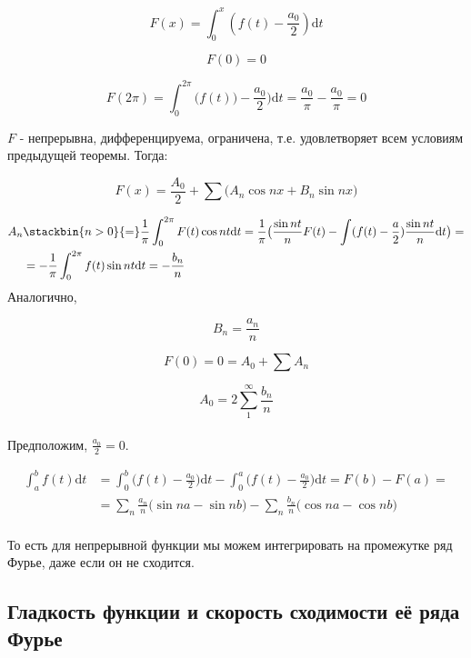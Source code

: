 \documentclass[12pt]{article}
\newcommand{\dd}{\ensuremath{\mathrm{d}}}
\begin{document}
  $$F(x) = \int_{0}^{x} (f(t) - \frac{a_0}{2}) \dd t$$
  
  $$F(0) = 0$$
  
  $$F(2\pi) = \int_{0}^{2\pi} \big( f(t)) - \frac{a_0}{2} \big) \dd t = \frac{a_0}{\pi} - \frac{a_0}{\pi} = 0$$
  
  $F$ - непрерывна, дифференцируема, ограничена, т.е. удовлетворяет всем условиям предыдущей теоремы.
  Тогда:
  
  $$F(x) = \frac{A_0}{2}+ \sum \big( A_n\cos{nx} + B_n\sin{nx} \big)$$
  
  \begin{align*}
      A_n & \stackbin{n > 0}{=} \frac{1}{\pi} \int_{0}^{2\pi} F(t)\cos{nt}\dd t = \frac{1}{\pi} \big( \frac{\sin{nt}}{n} F(t) - \int (f(t) - \frac{a}{2}) \frac{\sin{nt}}{n} \dd t \big) = \\
  &= -\frac{1}{\pi} \int_{0}^{2\pi} f(t)\sin{nt}\dd t = -\frac{b_n}{n} \\ 
  \end{align*}
  Аналогично,
  
  $$ B_n = \frac{a_n}{n}$$
  
  $$F(0) = 0 = A_0 + \sum A_n$$
  
  $$A_0 = 2 \sum_{1}^{\infty} \frac{b_n}{n}$$
  
  \paragraph{} 
  
  Предположим, $\frac{a_0}{2} = 0$.
 
  \begin{align*}
      \int_{a}^{b} f(t)\dd t &= \int_{0}^{b} \big(f(t)-\frac{a_0}{2}\big)\dd t - \int_{0}^{a} \big(f(t) - \frac{a_0}{2} \big) \dd t = F(b) - F(a) = \\
      &= \sum_{n} \frac{a_n}{n}\big( \sin{na} - \sin{nb} \big) - \sum_{n} \frac{b_n}{n} \big( \cos{na} - \cos{nb} \big) \\
  \end{align*}
  
  То есть для непрерывной функции мы можем интегрировать на промежутке ряд Фурье, даже если он не сходится.
  
 
\vspace{1em}

\subsection{Гладкость функции и скорость сходимости её ряда Фурье}
\end{document}
